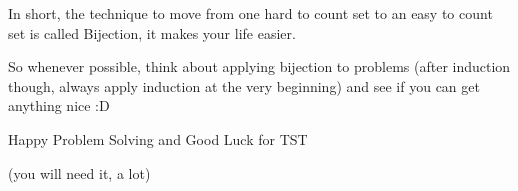 \documentclass[compress]{beamer}
\begin{document}
\begin{frame}
    In short, \textcolor{NordBrightBlue}{the technique to move from one hard
    to count set to an easy to count set is called Bijection}, it makes your
    life easier.

    \pause\vspace{1em}

    So whenever possible, think about applying bijection to problems
    \textcolor{NordBlack!30!NordWhite}{(after induction though, always apply
    induction at the very beginning)} and see if you can get anything nice :D

    \pause\vspace{1em}

    \textcolor{NordRed}{Happy Problem Solving and Good Luck for TST}

    \textcolor{NordBlack!30!NordWhite}{(you will need it, a lot)}
\end{frame}
\end{document}
